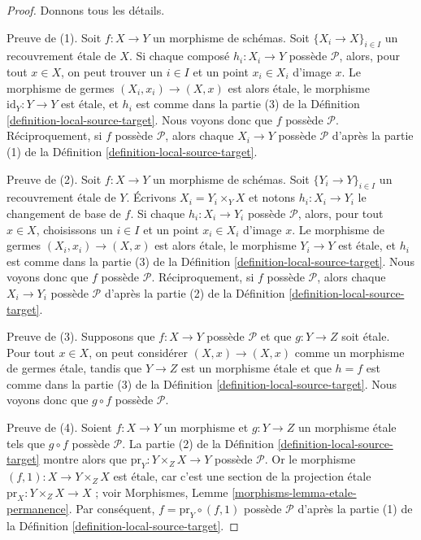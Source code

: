 \begin{proof}
Donnons tous les détails.

\medskip\noindent
Preuve de (1). Soit $f : X \to Y$ un morphisme de schémas.
Soit $\{X_i \to X\}_{i \in I}$ un recouvrement \'etale de $X$. Si chaque
composé $h_i : X_i \to Y$ possède $\mathcal{P}$, alors, pour tout $x \in X$,
on peut trouver un $i \in I$ et un point $x_i \in X_i$ d'image $x$. Le
morphisme de germes $(X_i, x_i) \to (X, x)$ est alors \'etale, le morphisme
$\text{id}_Y : Y \to Y$ est \'etale, et $h_i$ est comme dans la partie (3) de
la Définition \ref{definition-local-source-target}.
Nous voyons donc que $f$ possède $\mathcal{P}$.
Réciproquement, si $f$ possède $\mathcal{P}$, alors chaque $X_i \to Y$ possède
$\mathcal{P}$ d'après la partie (1) de la
Définition \ref{definition-local-source-target}.

\medskip\noindent
Preuve de (2). Soit $f : X \to Y$ un morphisme de schémas.
Soit $\{Y_i \to Y\}_{i \in I}$ un recouvrement \'etale de $Y$.
Écrivons $X_i = Y_i \times_Y X$ et notons $h_i : X_i \to Y_i$ le changement
de base de $f$. Si chaque $h_i : X_i \to Y_i$ possède $\mathcal{P}$, alors,
pour tout $x \in X$, choisissons un $i \in I$ et un point $x_i \in X_i$
d'image $x$. Le morphisme de germes $(X_i, x_i) \to (X, x)$ est alors
\'etale, le morphisme $Y_i \to Y$ est \'etale, et $h_i$ est comme dans la
partie (3) de la Définition \ref{definition-local-source-target}.
Nous voyons donc que $f$ possède $\mathcal{P}$.
Réciproquement, si $f$ possède $\mathcal{P}$, alors chaque $X_i \to Y_i$
possède $\mathcal{P}$ d'après la partie (2) de la
Définition \ref{definition-local-source-target}.

\medskip\noindent
Preuve de (3). Supposons que $f : X \to Y$ possède $\mathcal{P}$ et que
$g : Y \to Z$ soit \'etale. Pour tout $x \in X$, on peut considérer
$(X, x) \to (X, x)$ comme un morphisme de germes \'etale, tandis que
$Y \to Z$ est un morphisme \'etale et que $h = f$ est comme dans la partie (3)
de la Définition \ref{definition-local-source-target}.
Nous voyons donc que $g \circ f$ possède $\mathcal{P}$.

\medskip\noindent
Preuve de (4). Soient $f : X \to Y$ un morphisme et $g : Y \to Z$ un
morphisme \'etale tels que $g \circ f$ possède $\mathcal{P}$. La partie (2) de
la Définition \ref{definition-local-source-target} montre alors que
$\text{pr}_Y : Y \times_Z X \to Y$ possède $\mathcal{P}$. Or le morphisme
$(f, 1) : X \to Y \times_Z X$ est \'etale, car c'est une section de la
projection \'etale $\text{pr}_X : Y \times_Z X \to X$ ; voir
Morphismes, Lemme \ref{morphisms-lemma-etale-permanence}.
Par conséquent, $f = \text{pr}_Y \circ (f, 1)$ possède $\mathcal{P}$ d'après
la partie (1) de la Définition \ref{definition-local-source-target}.
\end{proof}


